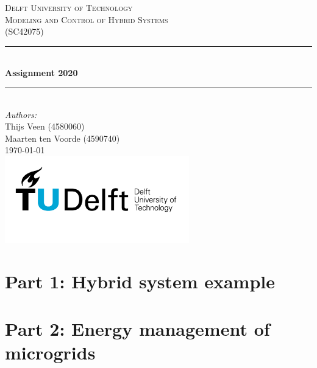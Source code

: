 \documentclass[a4paper]{article}
\begin{document}
\begin{titlepage}

\newcommand{\HRule}{\rule{\linewidth}{0.5mm}} 							%
\center 
 
\textsc{\LARGE Delft University of Technology}\\[1cm]

\textsc{\Large Modeling and Control of Hybrid Systems}\\[0.2cm]
\textsc{\large (SC42075)}\\[1cm] 										%
\HRule \\[0.8cm]
{ \huge \bfseries Assignment 2020}\\[0.7cm]								%
\HRule \\[2cm]
\large
\emph{Authors:}\\
Thijs Veen (4580060)\\
Maarten ten Voorde (4590740)\\[1.5cm]													%
{\large \today}\\[5cm]
\includegraphics[width=0.6\textwidth]{images/TU_delft_logo.jpg}\\[1cm] 	%
\vfill 
\end{titlepage}



\section{Part 1: Hybrid system example}



\section{Part 2: Energy management of microgrids}


















\begin{appendices}

\end{appendices}
\end{document}

